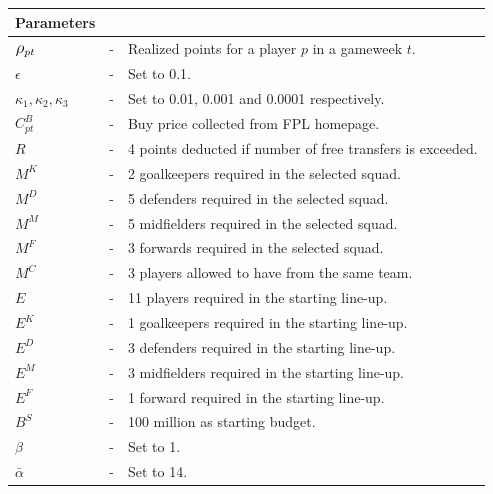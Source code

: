 \begin{table}[H] 
\tabcolsep=0.11cm
\centering
\begin{tabular}{@{}lll@{}}
\toprule
Parameters                       &   &                                                                                                \\ \midrule
$\mathlarger{\rho_{pt}}$ & - & Realized points for a player $p$ in a gameweek $t$. \\
$\epsilon$                       & - & Set to 0.1.                                                                     \\
$\kappa_{1}, \kappa_{2}, \kappa_{3} $                     & - & Set to 0.01, 0.001 and 0.0001 respectively.                                               \\
$C_{pt}^{B}$                     & - & Buy price collected from FPL homepage.  \\ 
$R$                              & - & 4 points deducted if number of free transfers is exceeded.       \\
$M^{K}$                          & - &  2 goalkeepers required in the selected squad.                                      \\
$M^{D}$                          & - &  5 defenders required in the selected squad.                         \\
$M^{M}$                          & - & 5 midfielders required in the selected squad.                                     \\
$M^{F}$                          & - & 3 forwards required in the selected squad.                                    \\
$M^{C}$                          & - & 3 players allowed to have from the same team.                                \\
$E$                              & - & 11 players required in the starting line-up.                              \\
$E^{K}$                          & - & 1 goalkeepers required in the starting line-up.                                       \\
$E^{D}$                          & - & 3 defenders required in the starting line-up.                  \\
$E^{M}$                          & - & 3 midfielders required in the starting line-up.                                 \\
$E^{F}$                          & - & 1 forward required in the starting line-up.                     \\
$B^{S}$                          & - & 100 million as starting budget.                                                                              \\
$\beta$                          & - & Set to 1.                                                                                  \\          
$\bar{\alpha}$                   & - & Set to 14.                                                                      \\


\end{tabular}
\end{table}
